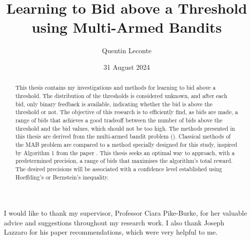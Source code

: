 \documentclass{statsmsc}
\title{Learning to Bid above a Threshold using Multi-Armed Bandits}
\author{Quentin Leconte}
\date{31 August 2024}
\begin{document}
\maketitle

\declaration 

\begin{acknowledgements}

    I would like to thank my supervisor, Professor Ciara Pike-Burke, for her valuable advice and suggestions throughout my research work. I also thank Joseph Lazzaro for his paper recommendations, which were very helpful to me.
\end{acknowledgements}

\mainmatter


\begin{abstract}
    This thesis contains my investigations and methods for learning to bid above a threshold. The distribution of the thresholds is considered unknown, and after each bid, only binary feedback is available, indicating whether the bid is above the threshold or not. The objective of this research is 
    to efficiently find, as bids are made, a range of bids that achieves a good tradeoff between the number of bids above the threshold and the bid values, which should not be too high. The methods presented in this thesis are derived from the multi-armed bandit problem (\cite{slivkins2024introductionmultiarmedbandits}).
    Classical methods of the MAB problem are compared to a method specially designed for this study, inspired by Algorithm 1 from the paper \cite{pmlr-v139-cheshire21a}. This thesis seeks an optimal way to approach, with a predetermined precision, a range of bids that maximises the algorithm's total reward. The desired precisions will be associated with a confidence level established using Hoeffding's or Bernstein's inequality.
\end{abstract}
\end{document}
